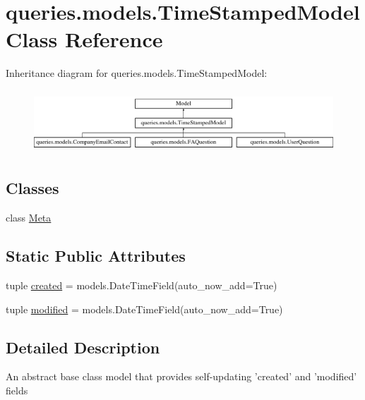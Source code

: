 \hypertarget{classqueries_1_1models_1_1_time_stamped_model}{\section{queries.\-models.\-Time\-Stamped\-Model Class Reference}
\label{classqueries_1_1models_1_1_time_stamped_model}
}
Inheritance diagram for queries.\-models.\-Time\-Stamped\-Model\-:\begin{figure}[H]
\begin{center}
\leavevmode
\includegraphics[height=2.393162cm]{classqueries_1_1models_1_1_time_stamped_model}
\end{center}
\end{figure}
\subsection*{Classes}
\begin{DoxyCompactItemize}
\item 
class \hyperlink{classqueries_1_1models_1_1_time_stamped_model_1_1_meta}{Meta}
\end{DoxyCompactItemize}
\subsection*{Static Public Attributes}
\begin{DoxyCompactItemize}
\item 
tuple \hyperlink{classqueries_1_1models_1_1_time_stamped_model_a73c3e8e89a787e93ad219eb967d3da4c}{created} = models.\-Date\-Time\-Field(auto\-\_\-now\-\_\-add=True)
\item 
tuple \hyperlink{classqueries_1_1models_1_1_time_stamped_model_a8508380cab20b34736996978b97d2802}{modified} = models.\-Date\-Time\-Field(auto\-\_\-now\-\_\-add=True)
\end{DoxyCompactItemize}


\subsection{Detailed Description}
\begin{DoxyVerb}An abstract base class model that provides self-updating 'created' and 'modified' fields
\end{DoxyVerb}
 

